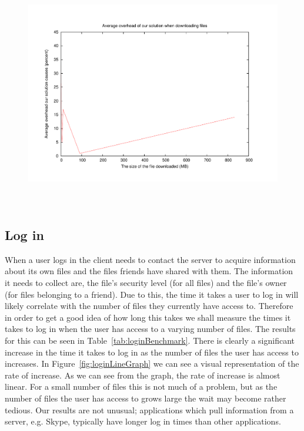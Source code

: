 \documentclass[12pt, titlepage]{article}
\begin{document}
\begin{figure}[H]
\centerline{\includegraphics[height=4.0in,width=7in,angle=0]{plots/downloadOverhead/downloadOverhead.pdf}}
\caption{}
\label{fig:downloadOverheadLineGraph}
\end{figure}

\subsection{Log in}
When a user logs in the client needs to contact the server to acquire information about its own files and the files friends have shared with them. The information it needs to collect are, the file's security level (for all files) and the file's owner (for files belonging to a friend). Due to this, the time it takes a user to log in will likely correlate with the number of files they currently have access to. Therefore in order to get a good idea of how long this takes we shall measure the times it takes to log in when the user has access to a varying number of files. The results for this can be seen in Table~\ref{tab:loginBenchmark}.
\newline \indent There is clearly a significant increase in the time it takes to log in as the number of files the user has access to increases. In Figure~\ref{fig:loginLineGraph} we can see a visual representation of the rate of increase. As we can see from the graph, the rate of increase is almost linear. For a small number of files this is not much of a problem, but as the number of files the user has access to grows large the wait may become rather tedious.
\newline \indent Our results are not unusual; applications which pull information from a server, e.g. Skype, typically have longer log in times than other applications.
\end{document}

